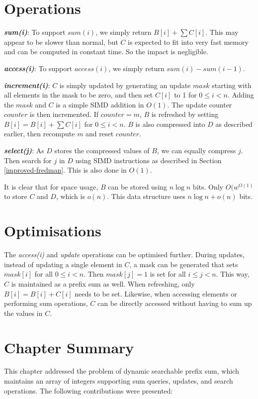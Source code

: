 \section{Operations}
\textbf{\textit{sum(i)}}: To support $sum(i)$, we simply return $B[i] + \sum C[i]$. This may appear to be slower than normal, but $C$ is expected to fit into very fast memory and can be computed in constant time. So the impact is negligible.\par
\textbf{\textit{access(i)}}: To support $access(i)$, we simply return $sum(i) - sum(i-1)$.\par
\textbf{\textit{increment(i)}}: $C$ is simply updated by generating an update $mask$ starting with all elements in the mask to be zero, and then set $C[i]$ to 1 for $0 \leq i < n$. Adding the $mask$ and $C$ is a simple SIMD addition in $O(1)$. The update counter $counter$ is then incremented. If $counter = m$, $B$ is refreshed by setting $B[i] = B[i] + \sum C[i]$ for $0 \leq i < n$. $B$ is also compressed into $D$ as described earlier, then recompute $m$ and reset $counter$.\par
\textbf{\textit{select(j)}}: As $D$ stores the compressed values of $B$, we can equally compress $j$. Then search for $j$ in $D$ using SIMD instructions as described in Section \ref{improved-fredman}. This is also done in $O(1)$.\par
It is clear that for space usage, $B$ can be stored using $n\log n$ bits. Only $O(w^{O(1)}$ to store $C$ and $D$, which is $o(n)$. This data structure uses $n\log n + o(n)$ bits.
\FloatBarrier
\section{Optimisations}
The \textit{access(i)} and \textit{update} operations can be optimised further. During updates, instead of updating a single element in $C$, a mask can be generated that sets $mask[i]$ for all $0 \leq i < n$. Then $mask[j] = 1$ is set for all $i \leq j < n$. This way, $C$ is maintained as a prefix sum as well. When refreshing, only $B[i] = B[i] + C[i]$ needs to be set. Likewise, when accessing elements or performing sum operations, $C$ can be directly accessed without having to sum up the values in $C$.

\FloatBarrier
\section{Chapter Summary}

This chapter addressed the problem of dynamic searchable prefix sum, which maintains an array of integers supporting sum queries, updates, and search operations. The following contributions were presented:

